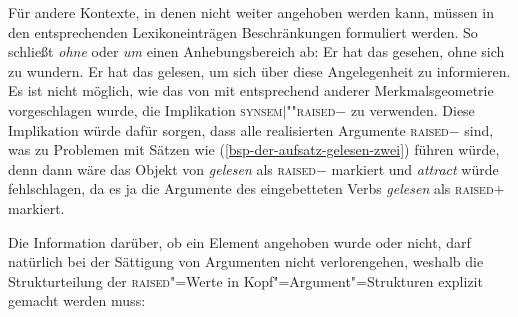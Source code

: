 {Für andere Kontexte, in denen nicht weiter angehoben werden kann, müssen in den entsprechenden
Lexikoneinträgen Beschränkungen formuliert werden. So schließt \zb \emph{ohne} oder \emph{um}
einen Anhebungsbereich ab:
\eal
\ex Er hat das gesehen, ohne sich zu wundern.
\ex Er hat das gelesen, um sich über diese Angelegenheit zu informieren.
\zl
Es ist nicht möglich, wie das von \citet[, Fußnote~54]{MdK2001a} mit entsprechend
anderer Merkmalsgeometrie vorgeschlagen wurde, die Implikation  \impl \textsc{synsem$|$""raised}$-$
zu verwenden. Diese Implikation würde dafür sorgen, dass alle realisierten Argumente \textsc{raised}$-$
sind, was zu Problemen mit Sätzen wie (\ref{bsp-der-aufsatz-gelesen-zwei}) führen würde, denn dann
wäre das Objekt von \emph{gelesen} als \textsc{raised}$-$ markiert und \emph{attract} würde
fehlschlagen, da es ja die Argumente des eingebetteten Verbs \emph{gelesen} als \textsc{raised}$+$
markiert.

Die Information darüber, ob ein Element angehoben wurde oder nicht, darf natürlich
bei der Sättigung von Argumenten nicht verlorengehen, weshalb die Strukturteilung
der \textsc{raised}"=Werte in Kopf"=Argument"=Strukturen explizit gemacht werden muss:
\begin{samepage}
\begin{schema}
\label{schema-bin-mark-final}
 \impl\\
\end{schema}
\end{samepage}


}
